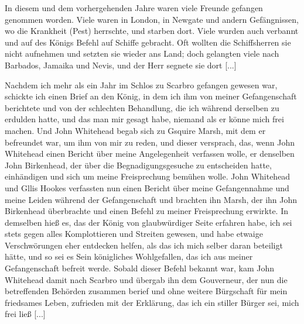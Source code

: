 In diesem und dem vorhergehenden Jahre waren viele
Freunde gefangen genommen worden. Viele waren in London, in
Newgate und andern Gefängnissen, wo die Krankheit (Pest) herrschte,
und starben dort. Viele wurden auch verbannt und auf des
Königs Befehl auf Schiffe gebracht. Oft wollten die Schiffsherren
sie nicht aufnehmen und setzten sie wieder ans Land; doch gelangten
viele nach Barbados, Jamaika und Nevis, 
und der Herr segnete sie dort [...]

Nachdem ich mehr als ein Jahr im Schlos zu Scarbro gefangen 
gewesen war, schickte ich einen Brief an den König, in
dem ich ihm von meiner Gefangenschaft berichtete und von der
schlechten Behandlung, die ich während derselben zu erdulden
hatte, und das man mir gesagt habe, niemand als er könne mich
frei machen. Und John Whitehead 
begab sich zu Gsquire Marsh,
mit dem er befreundet war, um ihm von mir zu reden, und dieser
versprach, das, wenn John Whitehead einen Bericht über meine
Angelegenheit verfassen wolle, er denselben John Birkenhead, der
über die Begnadigungsgesuche zu entscheiden hatte, einhändigen
und sich um meine Freisprechung bemühen wolle. John
Whitehead und Gllis Hookes 
verfassten nun einen Bericht über
meine Gefangennahme und meine Leiden während der Gefangenschaft 
und brachten ihn Marsh, der ihn John Birkenhead überbrachte 
und einen Befehl zu meiner Freisprechung erwirkte. In
demselben hieß es, das der König von glaubwürdiger Seite erfahren 
habe, ich sei stets gegen alles Komplottieren und Streiten
gewesen, und habe etwaige Verschwörungen eher entdecken helfen,
als das ich mich selber daran beteiligt hätte, und so sei es Sein
königliches Wohlgefallen, das ich aus meiner Gefangenschaft befreit
werde. Sobald dieser Befehl bekannt war, kam John Whitehead
damit nach Scarbro und übergab ihn dem Gouverneur, der nun
die betreffenden Behörden zusammen berief und ohne weitere
Bürgschaft für mein friedsames Leben, zufrieden mit der Erklärung,
das ich ein stiller Bürger sei, mich frei ließ [...]

